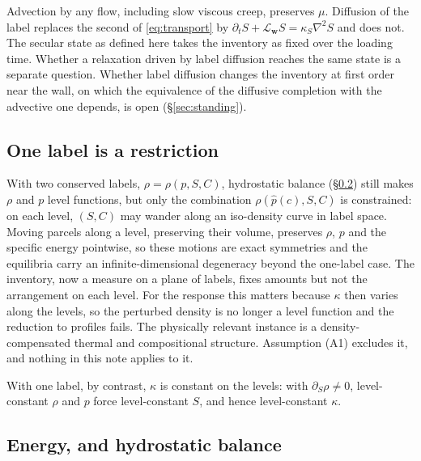 \documentclass[11pt]{article}
\theoremstyle{definition}
\theoremstyle{remark}
\newcommand{\bw}{\mathbf{w}}
\begin{document}
Advection by any flow, including slow viscous creep, preserves $\mu$.
Diffusion of the label replaces the second of \eqref{eq:transport} by
$\partial_tS + \mathcal L_{\bw}S = \kappa_S\nabla^2S$ and does not.
The secular state as defined here takes the inventory as fixed over
the loading time. Whether a relaxation driven by label diffusion
reaches the same state is a separate question.
Whether label diffusion changes the inventory at first order near the
wall, on which the equivalence of the diffusive completion with the
advective one depends, is open (\S\ref{sec:standing}).

\subsection{One label is a restriction}

With two conserved labels, $\rho = \rho(p, S, C)$, hydrostatic balance
(\S\ref{sec:NL-energy}) still makes $\rho$ and $p$ level functions, but
only the combination $\rho(\hat p(c), S, C)$ is constrained: on each
level, $(S, C)$ may wander along an iso-density curve in label space.
Moving parcels along a level, preserving their volume, preserves
$\rho$, $p$ and the specific energy pointwise, so these motions are
exact symmetries and the equilibria carry an infinite-dimensional
degeneracy beyond the one-label case. The inventory, now a measure on
a plane of labels, fixes amounts but not the arrangement on each
level. For the response this matters because $\kappa$ then varies
along the levels, so the perturbed density is no longer a level
function and the reduction to profiles fails. The physically relevant
instance is a density-compensated thermal and compositional
structure. Assumption (A1) excludes it, and nothing in this note
applies to it.

With one label, by contrast, $\kappa$ is constant on the levels: with
$\partial_S\rho \ne 0$, level-constant $\rho$ and $p$ force
level-constant $S$, and hence level-constant $\kappa$.

\subsection{Energy, and hydrostatic balance}
\label{sec:NL-energy}
\end{document}
